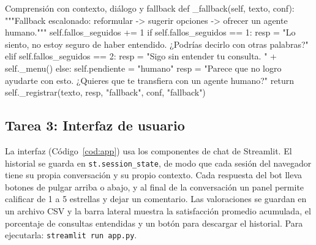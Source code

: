 \documentclass[11pt,letterpaper]{article}
\begin{document}
\begin{codigo}[label=cod:bot]{Comprensión con contexto, diálogo y fallback}
    def _fallback(self, texto, conf):
        """Fallback escalonado: reformular -> sugerir opciones -> ofrecer un agente humano."""
        self.fallos_seguidos += 1
        if self.fallos_seguidos == 1:
            resp = "Lo siento, no estoy seguro de haber entendido. ¿Podrías decirlo con otras palabras?"
        elif self.fallos_seguidos == 2:
            resp = "Sigo sin entender tu consulta. " + self._menu()
        else:
            self.pendiente = "humano"
            resp = "Parece que no logro ayudarte con esto. ¿Quieres que te transfiera con un agente humano?"
        return self._registrar(texto, resp, "fallback", conf, "fallback")
\end{codigo}

\subsection{Tarea 3: Interfaz de usuario}

La interfaz (Código~\ref{cod:app}) usa los componentes de chat de Streamlit. El historial se guarda en \texttt{st.session\_state}, de modo que cada sesión del navegador tiene su propia conversación y su propio contexto. Cada respuesta del bot lleva botones de pulgar arriba o abajo, y al final de la conversación un panel permite calificar de 1 a 5 estrellas y dejar un comentario. Las valoraciones se guardan en un archivo CSV y la barra lateral muestra la satisfacción promedio acumulada, el porcentaje de consultas entendidas y un botón para descargar el historial. Para ejecutarla: \texttt{streamlit run app.py}.
\end{document}
